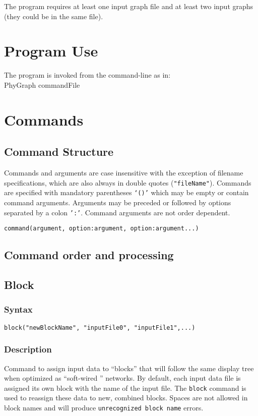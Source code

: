 \documentclass[11pt]{article}
\begin{document}
	

	
	The program requires at least one input graph file and at least two input graphs (they could be in the same file).

	
	\section{Program Use}
	The program is invoked from the command-line as in:\\
	PhyGraph commandFile\\
	
	\section{Commands}
		\subsection{Command Structure}
		Commands and arguments are case insensitive with the exception of filename specifications, which are also 
		always in double quotes (\texttt{"fileName"}).  Commands are specified with mandatory parentheses \texttt{`()'} which may be empty or
		contain command arguments. Arguments may be preceded or followed by options separated by a colon \texttt{':'}.  Command arguments are not 
		order dependent.
		
		\bigskip
		\texttt{command(argument, option:argument, option:argument...)}
		\subsection{Command order and processing}
	
	\subsection{Block}
		\subsubsection{Syntax}
		\texttt{block("newBlockName", "inputFile0", "inputFile1",...)}
		\subsubsection{Description}
		Command to assign input data to ``blocks'' that will follow the same display tree when optimized
		as ``soft-wired '' networks.  By default, each input data file is assigned its own block with the name
		of the input file.  The \texttt{block} command is used to reassign these data to new, combined blocks.
		Spaces are not allowed in block names and will produce \texttt{unrecognized block name} errors.    
\end{document}
